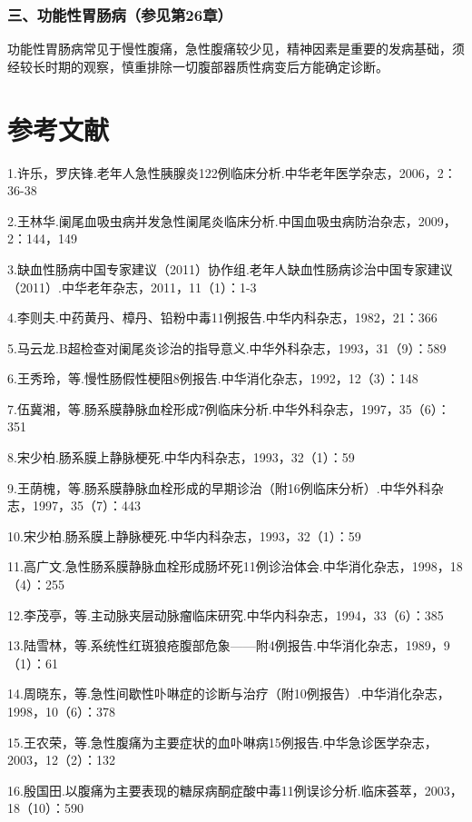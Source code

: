 \subsubsection{三、功能性胃肠病（参见第26章）}

功能性胃肠病常见于慢性腹痛，急性腹痛较少见，精神因素是重要的发病基础，须经较长时期的观察，慎重排除一切腹部器质性病变后方能确定诊断。

\protect\hypertarget{text00201.html}{}{}

\section{参考文献}

1.许乐，罗庆锋.老年人急性胰腺炎122例临床分析.中华老年医学杂志，2006，2：36-38

2.王林华.阑尾血吸虫病并发急性阑尾炎临床分析.中国血吸虫病防治杂志，2009，2：144，149

3.缺血性肠病中国专家建议（2011）协作组.老年人缺血性肠病诊治中国专家建议（2011）.中华老年杂志，2011，11（1）：1-3

4.李则夫.中药黄丹、樟丹、铅粉中毒11例报告.中华内科杂志，1982，21：366

5.马云龙.B超检查对阑尾炎诊治的指导意义.中华外科杂志，1993，31（9）：589

6.王秀玲，等.慢性肠假性梗阻8例报告.中华消化杂志，1992，12（3）：148

7.伍冀湘，等.肠系膜静脉血栓形成7例临床分析.中华外科杂志，1997，35（6）：351

8.宋少柏.肠系膜上静脉梗死.中华内科杂志，1993，32（1）：59

9.王荫槐，等.肠系膜静脉血栓形成的早期诊治（附16例临床分析）.中华外科杂志，1997，35（7）：443

10.宋少柏.肠系膜上静脉梗死.中华内科杂志，1993，32（1）：59

11.高广文.急性肠系膜静脉血栓形成肠坏死11例诊治体会.中华消化杂志，1998，18（4）：255

12.李茂亭，等.主动脉夹层动脉瘤临床研究.中华内科杂志，1994，33（6）：385

13.陆雪林，等.系统性红斑狼疮腹部危象------附4例报告.中华消化杂志，1989，9（1）：61

14.周晓东，等.急性间歇性卟啉症的诊断与治疗（附10例报告）.中华消化杂志，1998，10（6）：378

15.王农荣，等.急性腹痛为主要症状的血卟啉病15例报告.中华急诊医学杂志，2003，12（2）：132

16.殷国田.以腹痛为主要表现的糖尿病酮症酸中毒11例误诊分析.临床荟萃，2003，18（10）：590

